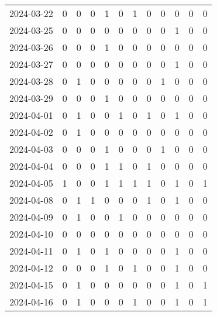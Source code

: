 \documentclass[dvipdfmx,oneside]{article}
\begin{document}
\begin{tabular}{lccccccccccc}
        2024-03-22 &     0 &     0 &     0 &     1 &     0 &     1 &     0 &     0 &     0 &     0 &     0 \\
        2024-03-25 &     0 &     0 &     0 &     0 &     0 &     0 &     0 &     0 &     1 &     0 &     0 \\
        2024-03-26 &     0 &     0 &     0 &     1 &     0 &     0 &     0 &     0 &     0 &     0 &     0 \\
        2024-03-27 &     0 &     0 &     0 &     0 &     0 &     0 &     0 &     0 &     1 &     0 &     0 \\
        2024-03-28 &     0 &     1 &     0 &     0 &     0 &     0 &     0 &     1 &     0 &     0 &     0 \\
        2024-03-29 &     0 &     0 &     0 &     1 &     0 &     0 &     0 &     0 &     0 &     0 &     0 \\
        2024-04-01 &     0 &     1 &     0 &     0 &     1 &     0 &     1 &     0 &     1 &     0 &     0 \\
        2024-04-02 &     0 &     1 &     0 &     0 &     0 &     0 &     0 &     0 &     0 &     0 &     0 \\
        2024-04-03 &     0 &     0 &     0 &     1 &     0 &     0 &     0 &     1 &     0 &     0 &     0 \\
        2024-04-04 &     0 &     0 &     0 &     1 &     1 &     0 &     1 &     0 &     0 &     0 &     0 \\
        2024-04-05 &     1 &     0 &     0 &     1 &     1 &     1 &     1 &     0 &     1 &     0 &     1 \\
        2024-04-08 &     0 &     1 &     1 &     0 &     0 &     0 &     1 &     0 &     1 &     0 &     0 \\
        2024-04-09 &     0 &     1 &     0 &     0 &     1 &     0 &     0 &     0 &     0 &     0 &     0 \\
        2024-04-10 &     0 &     0 &     0 &     0 &     0 &     0 &     0 &     0 &     0 &     0 &     0 \\
        2024-04-11 &     0 &     1 &     0 &     1 &     0 &     0 &     0 &     0 &     1 &     0 &     0 \\
        2024-04-12 &     0 &     0 &     0 &     1 &     0 &     1 &     0 &     0 &     1 &     0 &     0 \\
        2024-04-15 &     0 &     1 &     0 &     0 &     0 &     0 &     0 &     0 &     1 &     0 &     1 \\
        2024-04-16 &     0 &     1 &     0 &     0 &     0 &     1 &     0 &     0 &     1 &     0 &     1 \\

\end{tabular}
\end{document}
